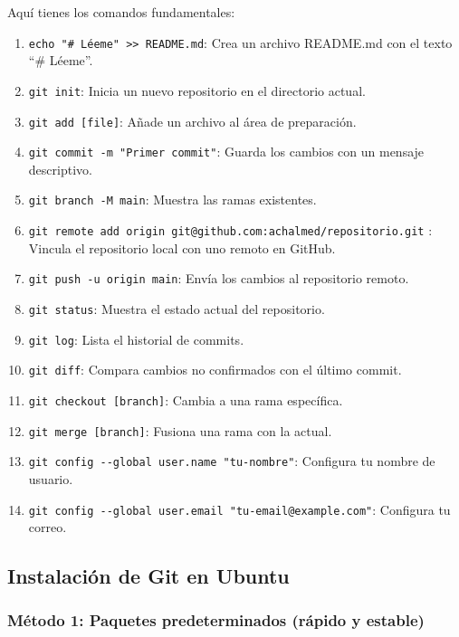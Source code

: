 \documentclass[
  doc,
  floatsintext,
  longtable,
  a4paper,
  nolmodern,
  notxfonts,
  notimes,
  colorlinks=true,linkcolor=blue,citecolor=blue,urlcolor=blue]{apa7}
\providecommand{\tightlist}{%
  \setlength{\itemsep}{0pt}\setlength{\parskip}{0pt}}
\begin{document}
Aquí tienes los comandos fundamentales:

\begin{enumerate}
\def\labelenumi{\arabic{enumi}.}
\tightlist
\item
  \texttt{echo\ "\#\ Léeme"\ \textgreater{}\textgreater{}\ README.md}:
  Crea un archivo README.md con el texto ``\# Léeme''.
\item
  \texttt{git\ init}: Inicia un nuevo repositorio en el directorio
  actual.
\item
  \texttt{git\ add\ {[}file{]}}: Añade un archivo al área de
  preparación.
\item
  \texttt{git\ commit\ -m\ "Primer\ commit"}: Guarda los cambios con un
  mensaje descriptivo.
\item
  \texttt{git\ branch\ -M\ main}: Muestra las ramas existentes.
\item
  \texttt{git\ remote\ add\ origin\ git@github.com:achalmed/repositorio.git}
  : Vincula el repositorio local con uno remoto en GitHub.
\item
  \texttt{git\ push\ -u\ origin\ main}: Envía los cambios al repositorio
  remoto.
\item
  \texttt{git\ status}: Muestra el estado actual del repositorio.
\item
  \texttt{git\ log}: Lista el historial de commits.
\item
  \texttt{git\ diff}: Compara cambios no confirmados con el último
  commit.
\item
  \texttt{git\ checkout\ {[}branch{]}}: Cambia a una rama específica.
\item
  \texttt{git\ merge\ {[}branch{]}}: Fusiona una rama con la actual.
\item
  \texttt{git\ config\ -\/-global\ user.name\ "tu-nombre"}: Configura tu
  nombre de usuario.
\item
  \texttt{git\ config\ -\/-global\ user.email\ "tu-email@example.com"}:
  Configura tu correo.
\end{enumerate}

\subsection{Instalación de Git en
Ubuntu}\label{instalaciuxf3n-de-git-en-ubuntu}

\subsubsection{Método 1: Paquetes predeterminados (rápido y
estable)}\label{muxe9todo-1-paquetes-predeterminados-ruxe1pido-y-estable}
\end{document}
